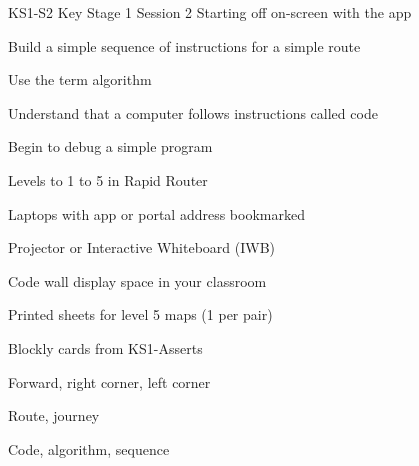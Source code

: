 \documentclass{../../../lessonplan}
\begin{document}
\lessonplantitle
    {KS1-S2}
    {Key Stage 1 Session 2}
    {Starting off on-screen with the app}

\preamble
    {
    \item Build a simple sequence of instructions for a simple route
    \item Use the term algorithm
    \item Understand that a computer follows instructions called code
    \item Begin to debug a simple program
    }
    {
    \item Levels to 1 to 5 in Rapid Router
    \item Laptops with app or portal address bookmarked
    \item Projector or Interactive Whiteboard (IWB)
    \item Code wall display space in your classroom
    \item Printed sheets for level 5 maps (1 per pair)
    \item Blockly cards from KS1-Asserts
    }
    {
    \item Forward, right corner, left corner
    \item Route, journey
    \item Code, algorithm, sequence
    }
\end{document}
